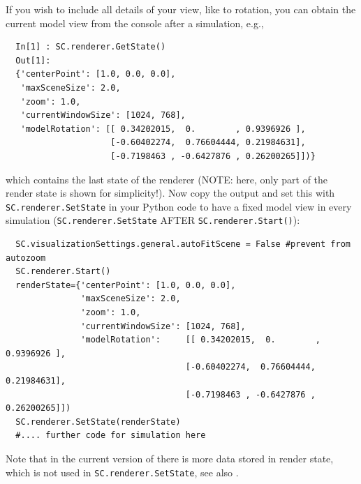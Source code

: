 If you wish to include all details of your view, like to rotation, you can obtain the current model view from the console after a simulation, e.g., 
\pythonstyle\begin{lstlisting}
  In[1] : SC.renderer.GetState()
  Out[1]: 
  {'centerPoint': [1.0, 0.0, 0.0],
   'maxSceneSize': 2.0,
   'zoom': 1.0,
   'currentWindowSize': [1024, 768],
   'modelRotation': [[ 0.34202015,  0.        , 0.9396926 ],
                     [-0.60402274,  0.76604444, 0.21984631],
                     [-0.7198463 , -0.6427876 , 0.26200265]])}
\end{lstlisting}
%
which contains the last state of the renderer (NOTE: here, only part of the render state is shown for simplicity!).
Now copy the output and set this with \texttt{SC.renderer.SetState} in your Python code to have a fixed model view in every simulation (\texttt{SC.renderer.SetState} AFTER \texttt{SC.renderer.Start()}):
\pythonstyle\begin{lstlisting}
  SC.visualizationSettings.general.autoFitScene = False #prevent from autozoom
  SC.renderer.Start()
  renderState={'centerPoint': [1.0, 0.0, 0.0],
               'maxSceneSize': 2.0,
               'zoom': 1.0,
               'currentWindowSize': [1024, 768],
               'modelRotation':     [[ 0.34202015,  0.        ,  0.9396926 ],
                                    [-0.60402274,  0.76604444,  0.21984631],
                                    [-0.7198463 , -0.6427876 ,  0.26200265]])
  SC.renderer.SetState(renderState)
  #.... further code for simulation here
\end{lstlisting}
Note that in the current version of \codeName there is more data stored in render state, which is not used in \texttt{SC.renderer.SetState},
see also .
\horizontalRuler
%

